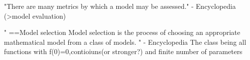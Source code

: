 "There are many metrics by which a model may be assessed." - Encyclopedia
(>model evaluation)

"
==Model selection
Model selection is the process of choosing an appropriate mathematical model
from a class of models.
" - Encyclopedia 
The class being all functions with f(0)=0,contioiuns(or stronger?) and finite number of parameters


